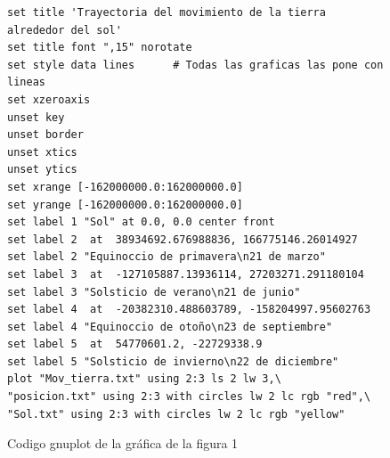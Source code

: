 \documentclass[12pt,a4paper,twoside]{article}
\begin{document}
\begin{figure}[h]
\begin{verbatim}
set title 'Trayectoria del movimiento de la tierra alrededor del sol'
set title font ",15" norotate
set style data lines      # Todas las graficas las pone con lineas
set xzeroaxis
unset key
unset border
unset xtics
unset ytics
set xrange [-162000000.0:162000000.0]
set yrange [-162000000.0:162000000.0]
set label 1 "Sol" at 0.0, 0.0 center front
set label 2  at  38934692.676988836, 166775146.26014927
set label 2 "Equinoccio de primavera\n21 de marzo" 
set label 3  at  -127105887.13936114, 27203271.291180104
set label 3 "Solsticio de verano\n21 de junio"  
set label 4  at  -20382310.488603789, -158204997.95602763
set label 4 "Equinoccio de otoño\n23 de septiembre" 
set label 5  at  54770601.2, -22729338.9
set label 5 "Solsticio de invierno\n22 de diciembre" 
plot "Mov_tierra.txt" using 2:3 ls 2 lw 3,\
"posicion.txt" using 2:3 with circles lw 2 lc rgb "red",\
"Sol.txt" using 2:3 with circles lw 2 lc rgb "yellow"
\end{verbatim}
\caption{Codigo gnuplot de la gráfica de la figura 1}
\label{fig:figura2}
\end{figure}
\end{document}
